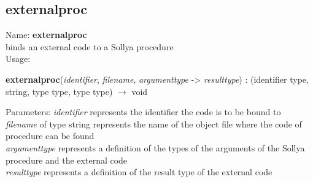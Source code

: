 \subsection{ externalproc }
\noindent Name: \textbf{externalproc}\\
binds an external code to a Sollya procedure\\

\noindent Usage: 
\begin{center}
\textbf{externalproc}(\emph{identifier}, \emph{filename}, \emph{argumenttype} -> \emph{resulttype}) : (\textsf{identifier type}, \textsf{string}, \textsf{type type}, \textsf{type type}) $\rightarrow$ \textsf{void}\\
\end{center}
Parameters: 
\emph{identifier} represents the identifier the code is to be bound to\\
\emph{filename} of type \textsf{string} represents the name of the object file where the code of procedure can be found\\
\emph{argumenttype} represents a definition of the types of the arguments of the Sollya procedure and the external code\\
\emph{resulttype} represents a definition of the result type of the external code\\

